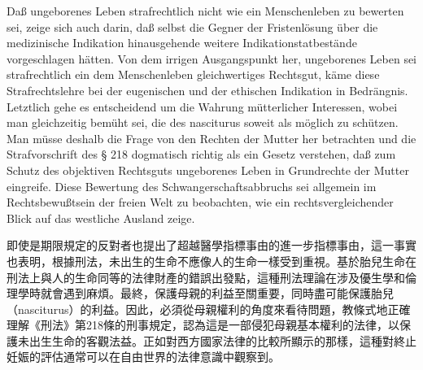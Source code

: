 \documentclass[12pt]{article}
\begin{document}
\syncleft
\begin{sourcepara}
Daß ungeborenes Leben strafrechtlich nicht wie ein Menschenleben zu bewerten sei, zeige sich auch darin, daß selbst die Gegner der Fristenlösung über die medizinische Indikation hinausgehende weitere Indikationstatbestände vorgeschlagen hätten. Von dem irrigen Ausgangspunkt her, ungeborenes Leben sei strafrechtlich ein dem Menschenleben gleichwertiges Rechtsgut, käme diese Strafrechtslehre bei der eugenischen und der ethischen Indikation in Bedrängnis. Letztlich gehe es entscheidend um die Wahrung mütterlicher Interessen, wobei man gleichzeitig bemüht sei, die des nasciturus soweit als möglich zu schützen. Man müsse deshalb die Frage von den Rechten der Mutter her betrachten und die Strafvorschrift des § 218 \abbrStGB{} dogmatisch richtig als ein Gesetz verstehen, daß zum Schutz des objektiven Rechtsguts ungeborenes Leben in Grundrechte der Mutter eingreife. Diese Bewertung des Schwangerschaftsabbruchs sei allgemein im Rechtsbewußtsein der freien Welt zu beobachten, wie ein rechtsvergleichender Blick auf das westliche Ausland zeige.
\end{sourcepara}
\begin{transpara}
即使是期限規定的反對者也提出了超越醫學指標事由的進一步指標事由，這一事實也表明，根據刑法，未出生的生命不應像人的生命一樣受到重視。基於胎兒生命在刑法上與人的生命同等的法律財產的錯誤出發點，這種刑法理論在涉及優生學和倫理學時就會遇到麻煩。最終，保護母親的利益至關重要，同時盡可能保護胎兒（nasciturus）的利益。因此，必須從母親權利的角度來看待問題，教條式地正確理解《刑法》第218條的刑事規定，認為這是一部侵犯母親基本權利的法律，以保護未出生生命的客觀法益。正如對西方國家法律的比較所顯示的那樣，這種對終止妊娠的評估通常可以在自由世界的法律意識中觀察到。
\end{transpara}
\end{document}
